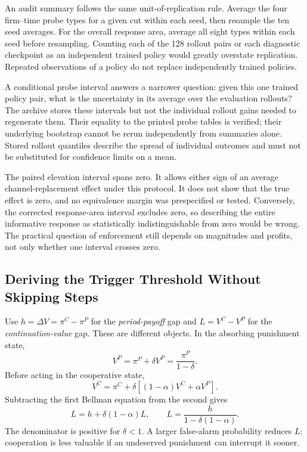 \documentclass{article}
\begin{document}
An audit summary follows the same unit-of-replication rule. Average the four firm--time probe types for a given cut within each seed, then resample the ten seed averages. For the overall response area, average all eight types within each seed before resampling. Counting each of the 128 rollout pairs or each diagnostic checkpoint as an independent trained policy would greatly overstate replication. Repeated observations of a policy do not replace independently trained policies.

A conditional probe interval answers a narrower question: given this one trained policy pair, what is the uncertainty in its average over the evaluation rollouts? The archive stores these intervals but not the individual rollout gains needed to regenerate them. Their equality to the printed probe tables is verified; their underlying bootstrap cannot be rerun independently from summaries alone. Stored rollout quantiles describe the spread of individual outcomes and must not be substituted for confidence limits on a mean.

The paired elevation interval spans zero. It allows either sign of an average channel-replacement effect under this protocol. It does not show that the true effect is zero, and no equivalence margin was prespecified or tested. Conversely, the corrected response-area interval excludes zero, so describing the entire informative response as statistically indistinguishable from zero would be wrong. The practical question of enforcement still depends on magnitudes and profits, not only whether one interval crosses zero.

\subsection{Deriving the Trigger Threshold Without Skipping Steps}

Use $h=\Delta V=\pi^C-\pi^P$ for the \emph{period-payoff} gap and $L=V^C-V^P$ for the \emph{continuation-value} gap. These are different objects. In the absorbing punishment state,
\[
V^P=\pi^P+\delta V^P=\frac{\pi^P}{1-\delta}.
\]
Before acting in the cooperative state,
\[
V^C=\pi^C+\delta[(1-\alpha)V^C+\alpha V^P].
\]
Subtracting the first Bellman equation from the second gives
\[
L=h+\delta(1-\alpha)L,
\qquad L=\frac{h}{1-\delta(1-\alpha)}.
\]
The denominator is positive for $\delta<1$. A larger false-alarm probability reduces $L$: cooperation is less valuable if an undeserved punishment can interrupt it sooner.
\end{document}
